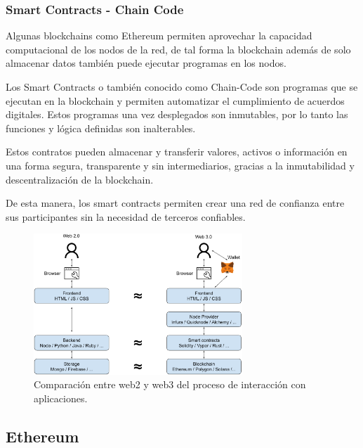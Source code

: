 \subsubsection{Smart Contracts - Chain Code}

Algunas blockchains como Ethereum permiten aprovechar la capacidad computacional de los nodos de la red, de tal forma la blockchain además de solo almacenar datos también puede ejecutar programas en los nodos.

\bigskip

Los Smart Contracts o también conocido como Chain-Code son programas que se ejecutan en la blockchain y permiten automatizar el cumplimiento de acuerdos digitales. Estos programas una vez desplegados son inmutables, por lo tanto las funciones y lógica definidas son inalterables.

\bigskip

Estos contratos pueden almacenar y transferir valores, activos o información en una forma segura, transparente y sin intermediarios, gracias a la inmutabilidad y descentralización de la blockchain.

\bigskip

De esta manera, los smart contracts permiten crear una red de confianza entre sus participantes sin la necesidad de terceros confiables.

\begin{figure}[H]
        \centering
        \includegraphics[width=0.7\textwidth]{img/capturas/web2vsweb3.png}
        \caption{Comparación entre web2 y web3 del proceso de interacción con aplicaciones.}
        \label{fig:configApi}
\end{figure}

\newpage

\subsection{Ethereum}

